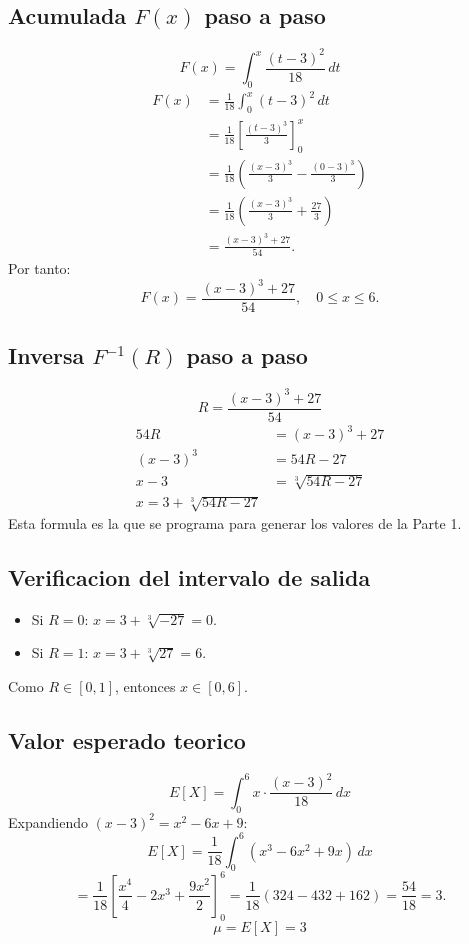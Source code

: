 \documentclass[12pt,a4paper]{article}
\begin{document}
\subsection{Acumulada $F(x)$ paso a paso}
\[
F(x)=\int_0^x \frac{(t-3)^2}{18}\,dt
\]
\begin{align*}
F(x)
&=\frac{1}{18}\int_0^x (t-3)^2\,dt \\
&=\frac{1}{18}\left[\frac{(t-3)^3}{3}\right]_0^x \\
&=\frac{1}{18}\left(\frac{(x-3)^3}{3}-\frac{(0-3)^3}{3}\right) \\
&=\frac{1}{18}\left(\frac{(x-3)^3}{3}+\frac{27}{3}\right) \\
&=\frac{(x-3)^3+27}{54}.
\end{align*}
Por tanto:
\[
\boxed{F(x)=\frac{(x-3)^3+27}{54}},\quad 0\le x\le 6.
\]

\subsection{Inversa $F^{-1}(R)$ paso a paso}
\[
R=\frac{(x-3)^3+27}{54}
\]
\begin{align*}
54R&=(x-3)^3+27 \\
(x-3)^3&=54R-27 \\
x-3&=\sqrt[3]{54R-27} \\
\boxed{x=3+\sqrt[3]{54R-27}}
\end{align*}
Esta formula es la que se programa para generar los valores de la Parte 1.

\subsection{Verificacion del intervalo de salida}
\begin{itemize}
  \item Si $R=0$: $x=3+\sqrt[3]{-27}=0$.
  \item Si $R=1$: $x=3+\sqrt[3]{27}=6$.
\end{itemize}
Como $R\in[0,1]$, entonces $x\in[0,6]$.

\subsection{Valor esperado teorico}
\[
E[X]=\int_0^6 x\cdot\frac{(x-3)^2}{18}\,dx
\]
Expandiendo $(x-3)^2=x^2-6x+9$:
\[
E[X]=\frac{1}{18}\int_0^6 (x^3-6x^2+9x)\,dx
\]
\[
=\frac{1}{18}\left[\frac{x^4}{4}-2x^3+\frac{9x^2}{2}\right]_0^6
=\frac{1}{18}(324-432+162)=\frac{54}{18}=3.
\]
\[
\boxed{\mu=E[X]=3}
\]
\end{document}

